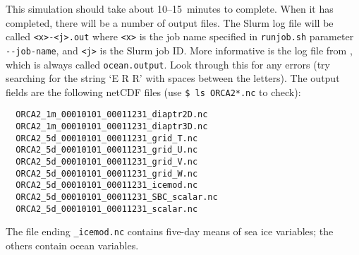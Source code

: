 This simulation should take about \mbox{10--15}~minutes to complete.
When it has completed, there will be a number of output files.
The Slurm log file will be called \verb|<x>-<j>.out| where \verb|<x>| is the job name specified in \verb|runjob.sh| parameter \verb|--job-name|, and \verb|<j>| is the Slurm job ID.
More informative is the log file from \NEMOSIcu{}, which is always called \verb|ocean.output|.
Look through this for any errors (try searching for the string `E R R' with spaces between the letters).
The output fields are the following netCDF files (use \verb|$ ls ORCA2*.nc| to check):

\begingroup\small
\begin{verbatim}
  ORCA2_1m_00010101_00011231_diaptr2D.nc
  ORCA2_1m_00010101_00011231_diaptr3D.nc
  ORCA2_5d_00010101_00011231_grid_T.nc
  ORCA2_5d_00010101_00011231_grid_U.nc
  ORCA2_5d_00010101_00011231_grid_V.nc
  ORCA2_5d_00010101_00011231_grid_W.nc
  ORCA2_5d_00010101_00011231_icemod.nc
  ORCA2_5d_00010101_00011231_SBC_scalar.nc
  ORCA2_5d_00010101_00011231_scalar.nc
\end{verbatim}
\endgroup

The file ending \verb|_icemod.nc| contains five-day means of sea ice variables; the others contain ocean variables.
